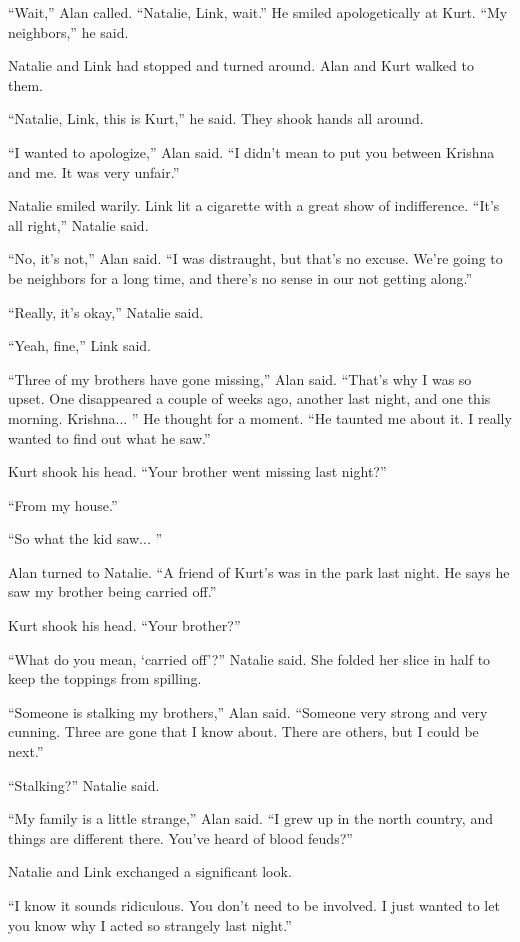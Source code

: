 ``Wait,'' Alan called.  ``Natalie, Link, wait.'' He smiled
apologetically at Kurt.  ``My neighbors,'' he said.

Natalie and Link had stopped and turned around.  Alan and Kurt walked
to them.

``Natalie, Link, this is Kurt,'' he said.  They shook hands all
around.

``I wanted to apologize,'' Alan said.  ``I didn't mean to put you
between Krishna and me.  It was very unfair.''

Natalie smiled warily.  Link lit a cigarette with a great show of
indifference.  ``It's all right,'' Natalie said.

``No, it's not,'' Alan said.  ``I was distraught, but that's no
excuse.  We're going to be neighbors for a long time, and there's no
sense in our not getting along.''

``Really, it's okay,'' Natalie said.

``Yeah, fine,'' Link said.

``Three of my brothers have gone missing,'' Alan said.  ``That's why I
was so upset.  One disappeared a couple of weeks ago, another last
night, and one this morning.  Krishna...  '' He thought for a moment. 
``He taunted me about it.  I really wanted to find out what he saw.''

Kurt shook his head.  ``Your brother went missing last night?''

``From my house.''

``So what the kid saw...  ''

Alan turned to Natalie.  ``A friend of Kurt's was in the park last
night.  He says he saw my brother being carried off.''

Kurt shook his head.  ``Your brother?''

``What do you mean, `carried off'?'' Natalie said.  She folded her
slice in half to keep the toppings from spilling.

``Someone is stalking my brothers,'' Alan said.  ``Someone very strong
and very cunning.  Three are gone that I know about.  There are
others, but I could be next.''

``Stalking?'' Natalie said.

``My family is a little strange,'' Alan said.  ``I grew up in the
north country, and things are different there.  You've heard of blood
feuds?''

Natalie and Link exchanged a significant look.

``I know it sounds ridiculous.  You don't need to be involved.  I just
wanted to let you know why I acted so strangely last night.''

